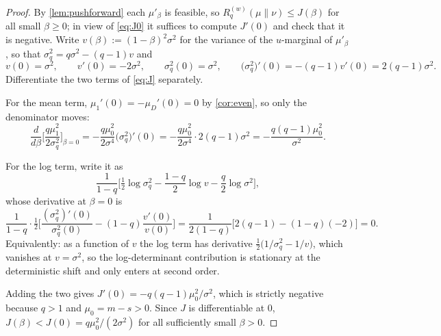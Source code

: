 \documentclass[10pt,a4paper]{amsart}
\def\half{{\tfrac12}}
\numberwithin{equation}{section}
\begin{document}
\begin{proof}
By \cref{lem:pushforward} each $\mu'_\beta$ is feasible, so $R^{(w)}_q(\mu\|\nu)\le J(\beta)$ for all small $\beta\ge0$; in view of \eqref{eq:J0} it suffices to compute $J'(0)$ and check that it is negative. Write $v(\beta):=(1-\beta)^2\sigma^2$ for the variance of the $u$-marginal of $\mu'_\beta$, so that $\sigma_q^2=q\sigma^2-(q-1)v$ and
$$v(0)=\sigma^2,\qquad v'(0)=-2\sigma^2,\qquad \sigma_q^2(0)=\sigma^2,\qquad \big(\sigma_q^2\big)'(0)=-(q-1)v'(0)=2(q-1)\sigma^2.$$
Differentiate the two terms of \eqref{eq:J} separately.

For the mean term, $\mu_1'(0)=-\mu_D'(0)=0$ by \cref{cor:even}, so only the denominator moves:
$$\frac{d}{d\beta}\bigg[\frac{q\mu_1^2}{2\sigma_q^2}\bigg]_{\beta=0}=-\frac{q\mu_0^2}{2\sigma^4}\big(\sigma_q^2\big)'(0)=-\frac{q\mu_0^2}{2\sigma^4}\cdot 2(q-1)\sigma^2=-\frac{q(q-1)\mu_0^2}{\sigma^2}.$$

For the log term, write it as
$$\frac{1}{1-q}\bigg[\half\log\sigma_q^2-\frac{1-q}{2}\log v-\frac{q}{2}\log\sigma^2\bigg],$$
whose derivative at $\beta=0$ is
$$\frac{1}{1-q}\cdot\half\bigg[\frac{(\sigma_q^2)'(0)}{\sigma_q^2(0)}-(1-q)\frac{v'(0)}{v(0)}\bigg]
=\frac{1}{2(1-q)}\Big[2(q-1)-(1-q)(-2)\Big]=0.$$
Equivalently: as a function of $v$ the log term has derivative $\half\big(1/\sigma_q^2-1/v\big)$, which vanishes at $v=\sigma^2$, so the log-determinant contribution is stationary at the deterministic shift and only enters at second order.

Adding the two gives $J'(0)=-q(q-1)\mu_0^2/\sigma^2$, which is strictly negative because $q>1$ and $\mu_0=m-s>0$. Since $J$ is differentiable at $0$, $J(\beta)<J(0)=q\mu_0^2/(2\sigma^2)$ for all sufficiently small $\beta>0$.
\end{proof}
\end{document}
